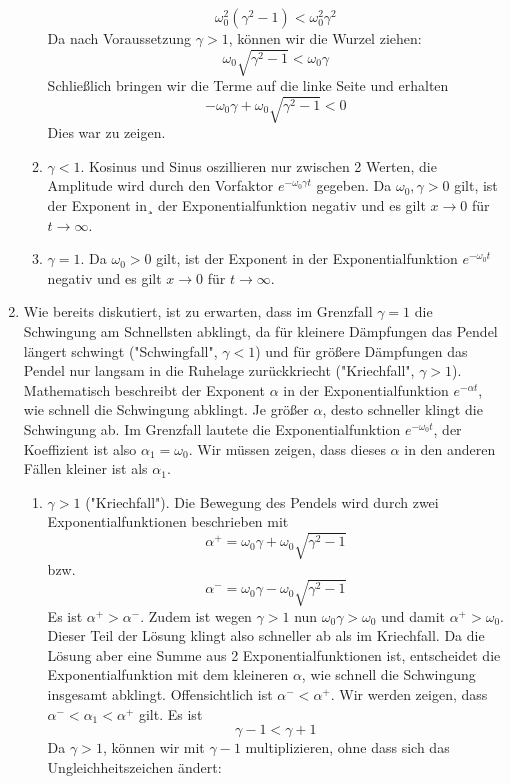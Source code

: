 \begin{enumerate}
\begin{enumerate}
		$$
			\omega_0^2 (\gamma^2 - 1) < \omega_0^2 \gamma^2
		$$
		Da nach Voraussetzung $\gamma > 1$, können wir die Wurzel ziehen:
		$$
			\omega_0 \sqrt{\gamma^2 - 1} < \omega_0 \gamma
		$$
		Schließlich bringen wir die Terme auf die linke Seite und erhalten
		$$
			- \omega_0 \gamma + \omega_0 \sqrt{\gamma^2 - 1} < 0
		$$
		Dies war zu zeigen.
		\item $\gamma < 1$. Kosinus und Sinus oszillieren nur zwischen 2 Werten, die Amplitude wird durch den Vorfaktor $e^{-\omega_0\gamma t}$ gegeben. Da $\omega_0, \gamma > 0$ gilt, ist der Exponent in¸ der Exponentialfunktion negativ und es gilt $x \to 0$ für $t \to \infty$.	
		\item $\gamma = 1$. Da $\omega_0 > 0$ gilt, ist der Exponent in der Exponentialfunktion $e^{-\omega_0 t}$ negativ und es gilt $x \to 0$ für $t \to \infty$.	
	\end{enumerate}
	\item Wie bereits diskutiert, ist zu erwarten, dass im Grenzfall $\gamma = 1$ die Schwingung am Schnellsten abklingt, da für kleinere Dämpfungen das Pendel längert schwingt ("Schwingfall", $\gamma < 1$) und für größere Dämpfungen das Pendel nur langsam in die Ruhelage zurückkriecht ("Kriechfall", $\gamma > 1$). Mathematisch beschreibt der Exponent $\alpha$ in der Exponentialfunktion $e^{-\alpha t}$, wie schnell die Schwingung abklingt. Je größer $\alpha$, desto schneller klingt die Schwingung ab. Im Grenzfall lautete die Exponentialfunktion $e^{-\omega_0 t}$, der Koeffizient ist also $\alpha_1=\omega_0$. Wir müssen zeigen, dass dieses $\alpha$ in den anderen Fällen kleiner ist als $\alpha_1$.
	\begin{enumerate}
		\item $\gamma > 1$ ("Kriechfall"). Die Bewegung des Pendels wird durch zwei Exponentialfunktionen beschrieben mit
		$$
			\alpha^+ = \omega_0\gamma + \omega_0\sqrt{\gamma^2-1}
		$$
		bzw.
		$$
			\alpha^- = \omega_0\gamma - \omega_0\sqrt{\gamma^2-1}
		$$
		Es ist $\alpha^+ > \alpha^-$. Zudem ist wegen $\gamma>1$ nun $\omega_0\gamma > \omega_0$ und damit $\alpha^+ > \omega_0$. Dieser Teil der Lösung klingt also schneller ab als im Kriechfall. Da die Lösung aber eine Summe aus 2 Exponentialfunktionen ist, entscheidet die Exponentialfunktion mit dem kleineren $\alpha$, wie schnell die Schwingung insgesamt abklingt. Offensichtlich ist $\alpha^- < \alpha^+$. Wir werden zeigen, dass $\alpha^- < \alpha_1 < \alpha^+$ gilt. Es ist
		$$
			\gamma -1 < \gamma + 1
		$$
		Da $\gamma>1$, können wir mit $\gamma-1$ multiplizieren, ohne dass sich das Ungleichheitszeichen ändert:

\end{enumerate}
\end{enumerate}
